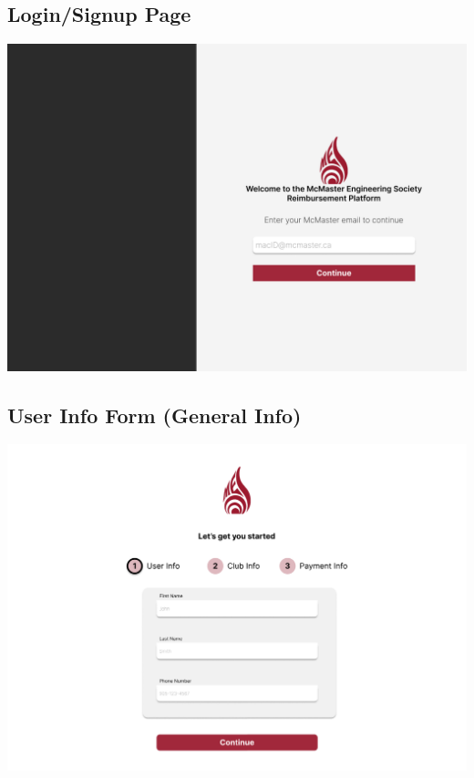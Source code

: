 \documentclass[12pt, titlepage]{article}
\begin{document}
\subsection{Login/Signup Page}
\includegraphics[]{imgs/LoginSignupPage.png}

\subsection{User Info Form (General Info)}
\includegraphics[]{imgs/UserInfoForm-GeneralInfo.png}
\end{document}
